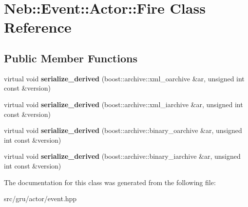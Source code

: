 \hypertarget{classNeb_1_1Event_1_1Actor_1_1Fire}{\section{\-Neb\-:\-:\-Event\-:\-:\-Actor\-:\-:\-Fire \-Class \-Reference}
\label{classNeb_1_1Event_1_1Actor_1_1Fire}
}
\subsection*{\-Public \-Member \-Functions}
\begin{DoxyCompactItemize}
\item 
\hypertarget{classNeb_1_1Event_1_1Actor_1_1Fire_aeeab712a8bc132bc4b119e05d47ba87d}{virtual void {\bfseries serialize\-\_\-derived} (boost\-::archive\-::xml\-\_\-oarchive \&ar, unsigned int const \&version)}\label{classNeb_1_1Event_1_1Actor_1_1Fire_aeeab712a8bc132bc4b119e05d47ba87d}

\item 
\hypertarget{classNeb_1_1Event_1_1Actor_1_1Fire_a2d0e2250cf3976238e8c4d623f0eea29}{virtual void {\bfseries serialize\-\_\-derived} (boost\-::archive\-::xml\-\_\-iarchive \&ar, unsigned int const \&version)}\label{classNeb_1_1Event_1_1Actor_1_1Fire_a2d0e2250cf3976238e8c4d623f0eea29}

\item 
\hypertarget{classNeb_1_1Event_1_1Actor_1_1Fire_aa09cae683af824389171eec336a054f7}{virtual void {\bfseries serialize\-\_\-derived} (boost\-::archive\-::binary\-\_\-oarchive \&ar, unsigned int const \&version)}\label{classNeb_1_1Event_1_1Actor_1_1Fire_aa09cae683af824389171eec336a054f7}

\item 
\hypertarget{classNeb_1_1Event_1_1Actor_1_1Fire_a026adc92ad9162573f5b0f87b4ac93bb}{virtual void {\bfseries serialize\-\_\-derived} (boost\-::archive\-::binary\-\_\-iarchive \&ar, unsigned int const \&version)}\label{classNeb_1_1Event_1_1Actor_1_1Fire_a026adc92ad9162573f5b0f87b4ac93bb}

\end{DoxyCompactItemize}


\-The documentation for this class was generated from the following file\-:\begin{DoxyCompactItemize}
\item 
src/gru/actor/event.\-hpp\end{DoxyCompactItemize}
